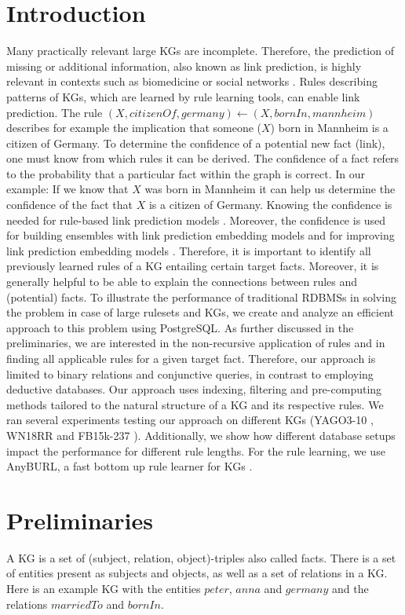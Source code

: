 \documentclass[english]{lni}
\begin{document}
\section{Introduction}
Many practically relevant large KGs are incomplete. Therefore, the prediction of missing or additional information, also known as link prediction, is highly relevant in contexts such as biomedicine \cite{OpenBioLink} or social networks \cite{SocialNetworks}. Rules describing patterns of KGs, which are learned by rule learning tools, can enable link prediction. The rule \((X, citizenOf, germany) \leftarrow (X, bornIn, mannheim)\) describes for example the implication that someone (\(X\)) born in Mannheim is a citizen of Germany. To determine the confidence of a potential new fact (link), one must know from which rules it can be derived. The confidence of a fact refers to the probability that a particular fact within the graph is correct. In our example: If we know that \(X\) was born in Mannheim it can help us determine the confidence of the fact that \(X\) is a citizen of Germany. Knowing the confidence is needed for rule-based link prediction models \cite{AnyBURL19}. Moreover, the confidence is used for building ensembles with link prediction embedding models \cite{RuleEmbeddingCombination1} and for improving link prediction embedding models \cite{RuleEmbeddingCombination2}. Therefore, it is important to identify all previously learned rules of a KG entailing certain target facts. Moreover, it is generally helpful to be able to explain the connections between rules and (potential) facts. To illustrate the performance of traditional RDBMSs in solving the problem in case of large rulesets and KGs, we create and analyze an efficient approach to this problem using PostgreSQL. As further discussed in the preliminaries, we are interested in the non-recursive application of rules and in finding all applicable rules for a given target fact. Therefore, our approach is limited to binary relations and conjunctive queries, in contrast to employing deductive databases. Our approach uses indexing, filtering and pre-computing methods tailored to the natural structure of a KG and its respective rules. We ran several experiments testing our approach on different KGs (YAGO3-10 \cite{YAGO3}, WN18RR \cite{WN18RR} and FB15k-237 \cite{FB15k-237}). Additionally, we show how different database setups impact the performance for different rule lengths. For the rule learning, we use AnyBURL, a fast bottom up rule learner for KGs \cite{AnyBURL19}.

\section{Preliminaries} 
A KG is a set of (subject, relation, object)-triples also called facts. There is a set of entities present as subjects and objects, as well as a set of relations in a KG. Here is an example KG with the entities \(peter\), \(anna\) and \(germany\) and the relations \(marriedTo\) and \(bornIn\).
\end{document}
